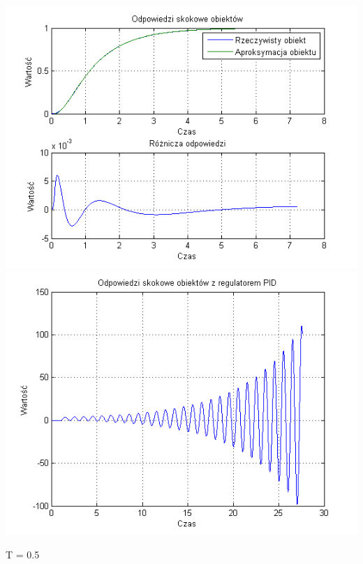 \documentclass[10pt,a4paper]{article}
\begin{document}
\begin{center}
\includegraphics[scale=1]{images/dwa/skrypt_95.png}\\
\includegraphics[scale=1]{images/dwa/skrypt_96.png}\\
\end{center}
\newpage
T = 0.5
\end{document}
